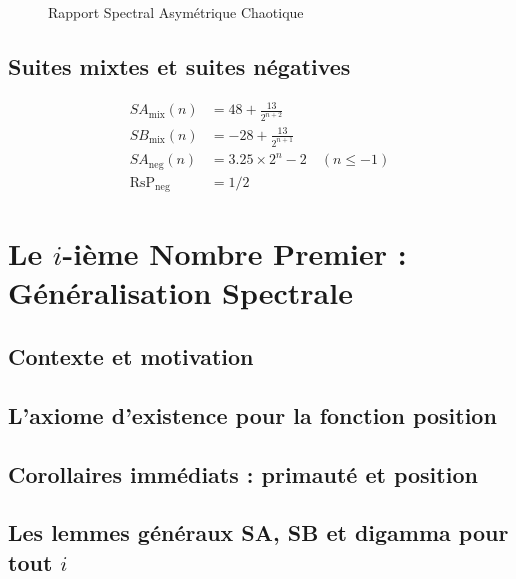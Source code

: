 \documentclass[11pt,a4paper]{article}
\begin{document}
\begin{figure}[h]
\centering
{}
\caption{Rapport Spectral Asymétrique Chaotique}
\end{figure}

\subsection{Suites mixtes et suites négatives}
\begin{align}
SA_{\text{mix}}(n) &= 48 + \frac{13}{2^{n+2}} \\
SB_{\text{mix}}(n) &= -28 + \frac{13}{2^{n+1}} \\
SA_{\text{neg}}(n) &= 3.25 \times 2^n - 2 \quad (n \le -1) \\
\text{RsP}_{\text{neg}} &= 1/2
\end{align}

\section{Le $i$-ième Nombre Premier : Généralisation Spectrale}

\subsection{Contexte et motivation}
\subsection{L'axiome d'existence pour la fonction position}
\subsection{Corollaires immédiats : primauté et position}
\subsection{Les lemmes généraux SA, SB et digamma pour tout $i$}
\end{document}
